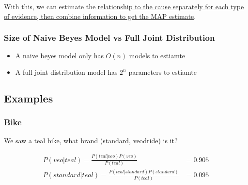     With this, we can estimate the \ul{relationship to the cause separately
    for each type of evidence, then combine information to get the MAP
    estimate}.

    \subsubsection{Size of Naive Beyes Model vs Full Joint Distribution}

      \begin{itemize}
        \item A naive beyes model only has $ O\left( n \right) $ models to
        estiamte
        \item A full joint distribution model has $ 2^{n} $ parameters to
        estiamte
      \end{itemize}

  \subsection{Examples}

    \subsubsection{Bike}

      We saw a teal bike, what brand (standard, veodride) is it?

      \begin{align*}
        P(veo | teal) = \frac{P(teal | veo) P(veo)}{P(teal)} &= 0.905 \\
        P(standard | teal) = \frac{P(teal | standard) P(standard)}{P(teal)} &= 0.095
      \end{align*}
